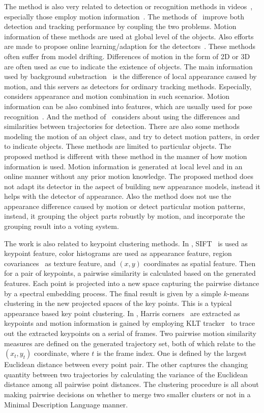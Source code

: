 The method is also very related to detection or recognition methods in videos~\citep{vd4,vd5,vd6,mtvvv,hogfl}, especially those employ motion information~\citep{vd1,vd2,vd3}. The methods of~\citep{vd1,vd2,vd3}  improve both detection and tracking performance by coupling the two problems. Motion information of these methods are used at global level of the objects. Also efforts are made to propose online learning/adaption for the detectors~\citep{vd4,vd5,vd6,dldt}. These methods often suffer from model drifting. Differences of motion in the form of 2D or 3D~\citep{my3} are often used as cue to indicate the existence of objects. The main information used by background substraction~\citep{bs1} is the difference of local appearance caused by motion, and this servers as detectors for ordinary tracking methods. Especially,~\citep{pvm} considers appearance and motion combination in such scenarios. Motion information can be also combined into features, which are  usually used for pose recognition~\citep{mafea}.  And the method of~\citep{my9} considers about using the differences and similarities between trajectories for detection. There are also some methods~\citep{maaa} modeling the motion of an object class, and try to detect motion patters, in order to indicate objects. These methods are limited to particular objects. The proposed method is different with these method in the manner of how motion information is used. Motion information is generated at local level and in an online manner without any prior motion knowledge. The proposed method does not adapt its detector in the aspect of building new appearance models, instead it helps with the detector of appearance. Also the method does not use the appearance difference caused by motion or detect particular motion patterns, instead, it grouping the object parts robustly by motion, and incorporate the grouping result into a voting system.

The work is also related to keypoint clustering methods. In \citep{mc}, SIFT~\citep{o12} is
used as keypoint feature, color histograms are used as appearance feature, region covariances~\citep{regionc}
as texture feature, and $(x,y)$ coordinates as spatial feature. Then
for a pair of keypoints, a pairwise similarity is calculated based
on the generated features. Each point is projected into a new space
capturing the pairwise distance by a spectral embedding process. The
final result is given by a simple $k$-means clustering in the new
projected spaces of the key points. This is a typical
appearance based key point clustering. In \citep{my9}, Harris
corners~\citep{ij2} are extracted as keypoints and motion information is
gained by employing KLT tracker~\citep{ij3} to trace out the extracted keypoints on a serial of frames. Two pairwise motion similarity
measures are defined on the generated trajectory set, both of which
relate to the $(x_t,y_t)$ coordinate, where $t$ is the frame index.
One is defined by the largest Euclidean distance between every point
pair. The other captures the changing quantity between two
trajectories by calculating the variance of the Euclidean distance
among all pairwise point distances. The clustering procedure is all about   making pairwise decisions on whether to merge two smaller
clusters or not in a Minimal Description Language manner.

